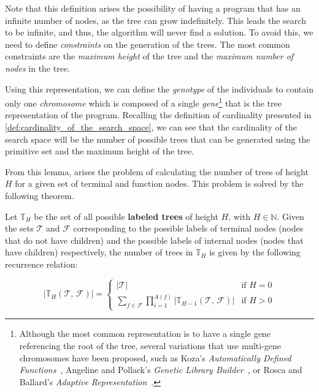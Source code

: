   Note that this definition arises the possibility of having a program that
  has an infinite number of nodes, as the tree can grow indefinitely.
  This leads the search to be infinite, and thus, the algorithm will never
  find a solution.
  To  avoid this, we need to define \emph{constraints} on the generation of the
  trees.
  The most common constraints are the \emph{maximum height} of the tree and the
  \emph{maximum number of nodes} in the tree.

  Using this representation, we can define the \emph{genotype} of the
  individuals to contain only one \emph{chromosome} which is composed of a
  single \emph{gene}\footnote{%
    Although the most common representation is to have a single gene referencing
    the root of the tree, several variations that use multi-gene chromosomes
    have been proposed, such as Koza's \textit{Automatically Defined 
    Functions}~\autocite{kozaGeneticProgrammingII1994}, Angeline and Pollack's 
    \textit{Genetic Library Builder}~\autocite{peterjangelineEvolutionaryInductionSubroutines1992,peterj.angelineGeneticProgrammingEmergent1994},
    or Rosca and Ballard's \textit{Adaptive Representation}~\autocite{roscaLearningAdaptingRepresentations1994}.
  } that is the tree representation of the program.
  Recalling the definition of cardinality presented in
  \vref{def:cardinality_of_the_search_space}, we can see that the cardinality of
  the search space will be the number of possible trees that can be generated
  using the primitive set and the maximum height of the tree.

  From this lemma, arises the problem of calculating the number of trees of
  height \(H\) for a given set of terminal and function nodes.
  This problem is solved by the following theorem.

  \begin{lemma}
  \label{thm:genetic_programming:representation:cardinality}
    Let \(\mathbb{T}_{H}\) be the set of all possible \textbf{labeled trees} of
    height \(H\), with \(H \in \mathbb{N}\).
    Given the sets \(\mathcal{T}\) and \(\mathcal{F}\) corresponding to the
    possible labels of terminal nodes (nodes that do not have children) and the
    possible labels of internal nodes (nodes that have children) respectively,
    the number of trees in \(\mathbb{T}_{H}\) is given by the following
    recurrence relation:

    \begin{equation}
      \label{eq:genetic_programming:representation:cardinality}
      |\mathbb{T}_{H}(\mathcal{T},\, \mathcal{F})| = \begin{cases}
        |\mathcal{T}| & \text{if } H = 0 \\
        \sum_{f \in \mathcal{F}} \prod_{i=1}^{A(f)} |\mathbb{T}_{H-1}(\mathcal{T},\, \mathcal{F})| & \text{if } H > 0
      \end{cases}
    \end{equation}
  \end{lemma}

